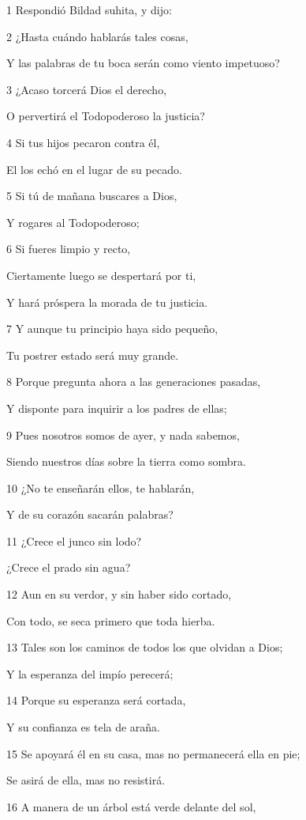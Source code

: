 \par 1 Respondió Bildad suhita, y dijo:
\par 2 ¿Hasta cuándo hablarás tales cosas,
\par Y las palabras de tu boca serán como viento impetuoso?
\par 3 ¿Acaso torcerá Dios el derecho,
\par O pervertirá el Todopoderoso la justicia?
\par 4 Si tus hijos pecaron contra él,
\par El los echó en el lugar de su pecado.
\par 5 Si tú de mañana buscares a Dios,
\par Y rogares al Todopoderoso;
\par 6 Si fueres limpio y recto,
\par Ciertamente luego se despertará por ti,
\par Y hará próspera la morada de tu justicia.
\par 7 Y aunque tu principio haya sido pequeño,
\par Tu postrer estado será muy grande.
\par 8 Porque pregunta ahora a las generaciones pasadas,
\par Y disponte para inquirir a los padres de ellas;
\par 9 Pues nosotros somos de ayer, y nada sabemos,
\par Siendo nuestros días sobre la tierra como sombra.
\par 10 ¿No te enseñarán ellos, te hablarán,
\par Y de su corazón sacarán palabras?
\par 11 ¿Crece el junco sin lodo?
\par ¿Crece el prado sin agua?
\par 12 Aun en su verdor, y sin haber sido cortado,
\par Con todo, se seca primero que toda hierba.
\par 13 Tales son los caminos de todos los que olvidan a Dios;
\par Y la esperanza del impío perecerá;
\par 14 Porque su esperanza será cortada,
\par Y su confianza es tela de araña.
\par 15 Se apoyará él en su casa, mas no permanecerá ella en pie;
\par Se asirá de ella, mas no resistirá.
\par 16 A manera de un árbol está verde delante del sol,
